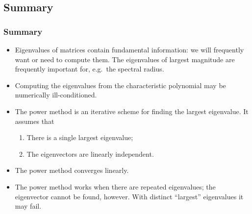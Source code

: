 \documentclass{beamer}
\begin{document}
\subsection{Summary}

\begin{frame}
  \frametitle{Summary}

  \begin{itemize}
  \item Eigenvalues of matrices contain fundamental information: we
    will frequently want or need to compute them. The eigenvalues of
    largest magnitude are frequently important for, e.g.\ the spectral
    radius.
  \item Computing the eigenvalues from the characteristic polynomial
    may be numerically ill-conditioned.
  \item The power method is an iterative scheme for finding the
    largest eigenvalue. It assumes that
    \begin{enumerate}
    \item There is a single largest eigenvalue;
    \item The eigenvectors are linearly independent.
    \end{enumerate}
  \item The power method converges linearly.
  \item The power method works when there are repeated eigenvalues;
    the eigenvector cannot be found, however. With distinct
    ``largest'' eigenvalues it may fail.
  \end{itemize}

\end{frame}
\end{document}
